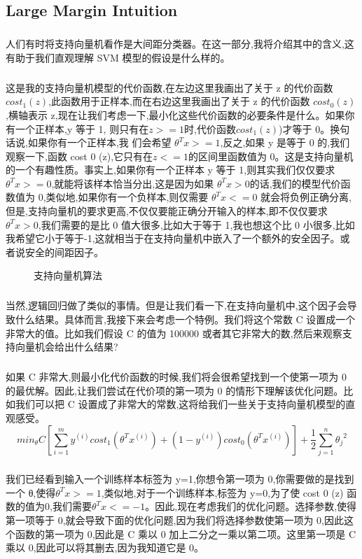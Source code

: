 \documentclass{article}
\begin{document}
\begin{CJK}{UTF8}{gbsn}
\subsection{Large Margin Intuition}
\subparagraph{}
人们有时将支持向量机看作是大间距分类器。在这一部分,我将介绍其中的含义,这有助于我们直观理解 SVM 模型的假设是什么样的。
\subparagraph{}
这是我的支持向量机模型的代价函数,在左边这里我画出了关于 z 的代价函数$cost_1(z)$,此函数用于正样本,而在右边这里我画出了关于 z 的代价函数 $cost_0(z)$,横轴表示 z,现在让我们考虑一下,最小化这些代价函数的必要条件是什么。如果你有一个正样本,y 等于 1,
则只有在$z>=1$时,代价函数$cost_1(z)$)才等于 0。换句话说,如果你有一个正样本,我
们会希望 $\theta^Tx>=1$,反之,如果 y 是等于 0 的,我们观察一下,函数 cost 0 (z),它只有在$z<=1$的区间里函数值为 0。这是支持向量机的一个有趣性质。事实上,如果你有一个正样本 y 等于 1,则其实我们仅仅要求$\theta^Tx>=0$,就能将该样本恰当分出,这是因为如果 $\theta^Tx>0$的话,我们的模型代价函数值为 0,类似地,如果你有一个负样本,则仅需要 $\theta^Tx<=0$ 就会将负例正确分离,但是,支持向量机的要求更高,不仅仅要能正确分开输入的样本,即不仅仅要求$\theta^Tx>0$,我们需要的是比 0 值大很多,比如大于等于 1,我也想这个比 0 小很多,比如我希望它小于等于-1,这就相当于在支持向量机中嵌入了一个额外的安全因子。或者说安全的间距因子。
\begin{figure}[H]
\label{fig:707}
\caption{支持向量机算法}
\end{figure}
\subparagraph{}
当然,逻辑回归做了类似的事情。但是让我们看一下,在支持向量机中,这个因子会导致什么结果。具体而言,我接下来会考虑一个特例。我们将这个常数 C 设置成一个非常大的值。比如我们假设 C 的值为 100000 或者其它非常大的数,然后来观察支持向量机会给出什么结果?
\subparagraph{}
如果 C 非常大,则最小化代价函数的时候,我们将会很希望找到一个使第一项为 0 的最优解。因此,让我们尝试在代价项的第一项为 0 的情形下理解该优化问题。比如我们可以把 C 设置成了非常大的常数,这将给我们一些关于支持向量机模型的直观感受。
\begin{equation}
min_{\theta}C[\sum_{i=1}^my^{(i)}cost_1(\theta^Tx^{(i)})+(1-y^{(i)})cost_0(\theta^Tx^{(i)})]+\frac{1}{2}\sum_{j=1}^n{\theta_j}^2
\end{equation}
\subparagraph{}
我们已经看到输入一个训练样本标签为 y=1,你想令第一项为 0,你需要做的是找到一个 θ,使得$\theta^Tx>=1$,类似地,对于一个训练样本,标签为 y=0,为了使 cost 0 (z) 函数的值为0,我们需要$\theta^Tx<=-1$。因此,现在考虑我们的优化问题。选择参数,使得第一项等于 0,就会导致下面的优化问题,因为我们将选择参数使第一项为 0,因此这个函数的第一项为 0,因此是 C 乘以 0 加上二分之一乘以第二项。这里第一项是 C 乘以 0,因此可以将其删去,因为我知道它是 0。

\end{CJK}
\end{document}
